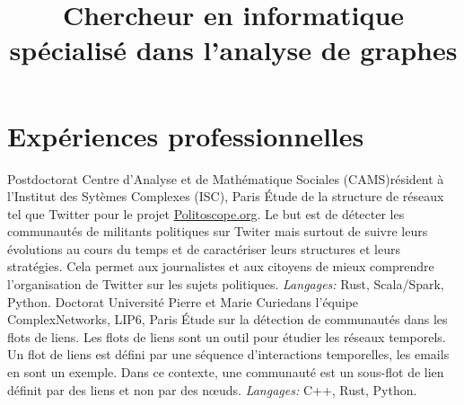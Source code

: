 \documentclass[11pt,a4paper]{moderncv}
\title{Chercheur en informatique spécialisé dans l'analyse de graphes}
\begin{document}
\maketitle
\vspace{-1.2cm}

\section{Expériences professionnelles}
 {Postdoctorat} {Centre d’Analyse et de Mathématique Sociales (CAMS)}{}{résident à l'Institut des Sytèmes Complexes (ISC), Paris}
{
	Étude de la structure de réseaux tel que Twitter pour le projet \url{Politoscope.org}. Le but est de détecter les communautés de militants politiques sur Twiter mais surtout de suivre leurs évolutions au cours du temps et de caractériser leurs structures et leurs stratégies. Cela permet aux journalistes et aux citoyens de mieux comprendre l'organisation de Twitter sur les sujets politiques. \textit{Langages:} Rust, Scala/Spark, Python.
}
\vspace*{0.2cm}
 {Doctorat} {Université Pierre et Marie Curie}{}{dans l'équipe ComplexNetworks, LIP6, Paris}
{
 Étude sur la détection de communautés dans les flots de liens. Les flots de liens sont un outil pour étudier les réseaux temporels.
 Un flot de liens est défini par une séquence d'interactions temporelles, les emails en sont un exemple. Dans ce contexte, une communauté est un sous-flot de lien définit par des liens et non par des n\oe uds. \textit{Langages:} C++, Rust, Python.
}
\vspace*{0.2cm}
%
\vspace*{0.2cm}

\end{document}
